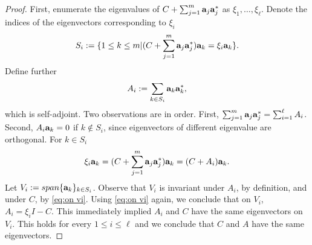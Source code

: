 \documentclass{amsart}
\numberwithin{equation}{section}
\begin{document}
\simdiag
\begin{proof}
  First, enumerate the eigenvalues of $C + \sum_{j=1}^m
  \mathbf{a}_j\mathbf{a}_j^*$ as $\xi_1,\dots,\xi_\ell$. Denote the
  indices of the eigenvectors corresponding to $\xi_i$
  \begin{equation*}
    S_i := \{ 1 \leq k \leq m | (C + \sum_{j=1}^m \mathbf{a}_j\mathbf{a}_j^* )\mathbf{a}_k = \xi_i \mathbf{a}_k \}.
  \end{equation*}
  Define further
  \begin{equation*}
    A_i := \sum_{k \in S_i} \mathbf{a}_k \mathbf{a}_k^*,
  \end{equation*}
  which is self-adjoint. Two observations are in order. First,
  $\sum_{j=1}^m \mathbf{a}_j\mathbf{a}_j^* = \sum_{i=1}^\ell A_i$. Second, $A_i
  \mathbf{a}_k = 0$ if $k\not \in S_i$, since eigenvectors of different
  eigenvalue are orthogonal. For $k \in S_i$
  \begin{equation}\label{eq:on vi}
    \xi_i \mathbf{a}_k = (C + \sum_{j=1}^m \mathbf{a}_j \mathbf{a}_j^* ) \mathbf{a}_k = (C + A_i) \mathbf{a}_k.
  \end{equation}
  Let $V_i := span \{\mathbf{a}_k \}_{k\in S_i}$. Observe that $V_i$ is
  invariant under $A_i$, by definition, and under $C$, by \eqref{eq:on
    vi}. Using \eqref{eq:on vi} again, we conclude that on $V_i$, $A_i
  = \xi_iI - C$. This immediately implied $A_i$ and $C$ have the
  same eigenvectors on $V_i$. This holds for every $1 \leq i \leq
  \ell$ and we conclude that $C$ and $A$ have the same eigenvectors.
\end{proof}
\end{document}
